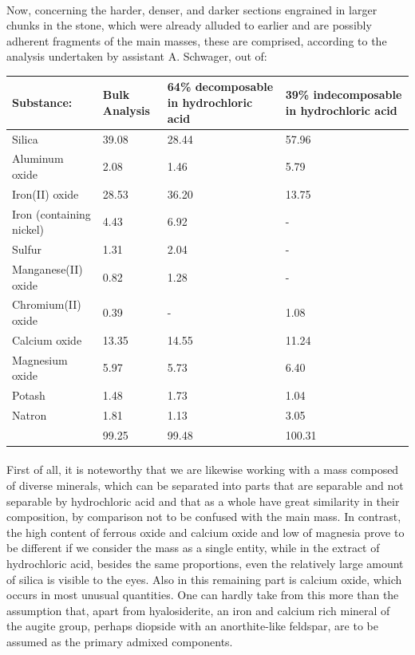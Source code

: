 \documentclass[a4paper, 12pt, oneside]{article}
\begin{document}
\paragraph*{}
Now, concerning the harder, denser, and darker sections engrained in larger chunks in the stone, which were already alluded to earlier and are possibly adherent fragments of the main masses, these are comprised, according to the analysis undertaken by assistant A. Schwager, out of:
\begin{center}
\small
    \begin{tabular}{|l|p{1.7cm}|p{2.9cm}|p{2.9cm}|}
        \hline
        Substance: & Bulk Analysis & 64\% decomposable in hydrochloric acid & 39\% indecomposable in hydrochloric acid\\\hline
        Silica & 39.08 & 28.44 & 57.96\\\hline
        Aluminum oxide & 2.08 & 1.46 & 5.79\\\hline
        Iron(II) oxide & 28.53 & 36.20 & 13.75\\\hline
        Iron (containing nickel) & 4.43 & 6.92 & -\\\hline
        Sulfur & 1.31 & 2.04 & -\\\hline
        Manganese(II) oxide & 0.82 & 1.28 & -\\\hline
        Chromium(II) oxide & 0.39 & - & 1.08\\\hline
        Calcium oxide & 13.35 & 14.55 & 11.24\\\hline
        Magnesium oxide & 5.97 & 5.73 & 6.40\\\hline
        Potash & 1.48 & 1.73 & 1.04\\\hline
        Natron & 1.81 & 1.13 & 3.05\\\hline
        & 99.25 & 99.48 & 100.31\\
        \hline
    \end{tabular}
\end{center}
\paragraph*{}
First of all, it is noteworthy that we are likewise working with a mass composed of diverse minerals, which can be separated into parts that are separable and not separable by hydrochloric acid and that as a whole have great similarity in their composition, by comparison not to be confused with the main mass. In contrast, the high content of ferrous oxide and calcium oxide and low of magnesia prove to be different if we consider the mass as a single entity, while in the extract of hydrochloric acid, besides the same proportions, even the relatively large amount of silica is visible to the eyes. Also in this remaining part is calcium oxide, which occurs in most unusual quantities. One can hardly take from this more than the assumption that, apart from hyalosiderite, an iron and calcium rich mineral of the augite group, perhaps diopside with an anorthite-like feldspar, are to be assumed as the primary admixed components.
\end{document}
